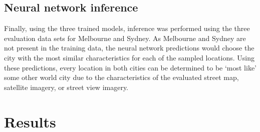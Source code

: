 \documentclass[sageh,times]{sagej}
\begin{document}
%
%
%
%
%



\subsection{Neural network inference}\label{sec:methods5}    
Finally, using the three trained models, inference was performed using the three evaluation data sets for Melbourne and Sydney. As Melbourne and Sydney are not present in the training data, the neural network predictions would choose the city with the most similar characteristics for each of the sampled locations. Using these predictions, every location in both cities can be determined to be `most like' some other world city due to the characteristics of the evaluated street map, satellite imagery, or street view imagery.

\section{Results}\label{sec:results}
\end{document}
